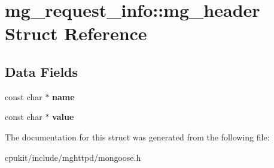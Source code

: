 \hypertarget{structmg__request__info_1_1mg__header}{}\section{mg\+\_\+request\+\_\+info\+::mg\+\_\+header Struct Reference}
\label{structmg__request__info_1_1mg__header}
\subsection*{Data Fields}
\begin{DoxyCompactItemize}
\item 
\mbox{\label{structmg__request__info_1_1mg__header_a9c7ba6f537cac404bbd94032a81786b1}} 
const char $\ast$ {\bfseries name}
\item 
\mbox{\label{structmg__request__info_1_1mg__header_a2f456ca1f6b9e40aae18ffbbc95ff59e}} 
const char $\ast$ {\bfseries value}
\end{DoxyCompactItemize}


The documentation for this struct was generated from the following file\+:\begin{DoxyCompactItemize}
\item 
cpukit/include/mghttpd/mongoose.\+h\end{DoxyCompactItemize}

